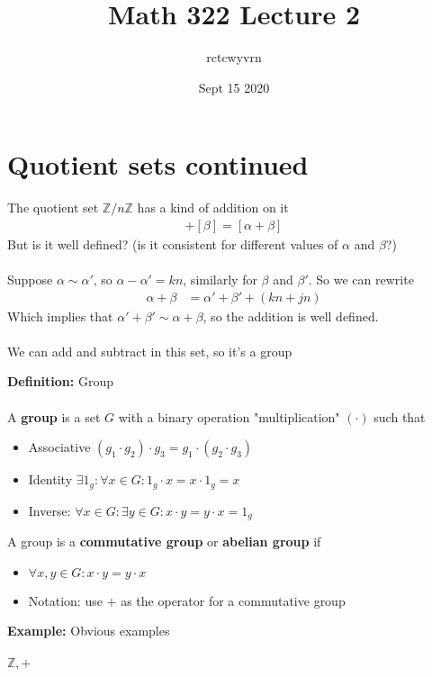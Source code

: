 \documentclass{article}
\title{Math 322 Lecture 2}
\author{rctcwyvrn}
\date{Sept 15 2020}
\newcommand{\Z}{\mathbb{Z}}
\begin{document}
\maketitle

\section{Quotient sets continued}
The quotient set $\Z /n\Z$ has a kind of addition on it
\begin{align}
	[\alpha] + [\beta] = [\alpha+\beta]
\end{align}
But is it well defined? (is it consistent for different values of $\alpha$ and $\beta$?) \\
~\\
Suppose $\alpha\sim\alpha '$, so $\alpha -\alpha' = kn$, similarly for $\beta$ and $\beta'$. So we can rewrite 
\begin{align}
	\alpha + \beta &= \alpha' + \beta' + (kn+jn)
\end{align}
Which implies that $\alpha' + \beta' \sim \alpha + \beta$, so the addition is well defined. \\
~\\
We can add and subtract in this set, so it's a group
\begin{definition} 
\textbf{Definition:} Group \\
~\\
A {\color{blue} \textbf{group}} is a set $G$ with a binary operation "multiplication" $(\cdot)$ such that
\begin{itemize}
	\item Associative $(g_1\cdot g_2) \cdot g_3 = g_1\cdot (g_2\cdot g_3)$
	\item Identity $\exists 1_g: \forall x\in G: 1_g \cdot x = x\cdot 1_g = x$
	\item Inverse: $\forall x\in G: \exists y\in G: x\cdot y = y\cdot x = 1_g$
\end{itemize}
A group is a {\color{blue} \textbf{commutative group}} or {\color{blue} \textbf{abelian group}} if
\begin{itemize}
	\item $\forall x,y \in G: x\cdot y= y\cdot x$
	\item Notation: use $+$ as the operator for a commutative group
\end{itemize}
\end{definition}
\begin{example} 
\textbf{Example:} Obvious examples \\
~\\
$\Z, +$
\end{example}
\end{document}
